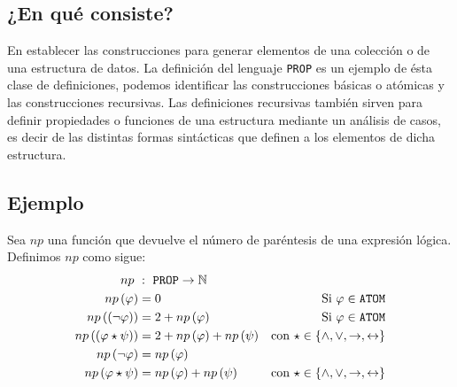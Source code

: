 \documentclass[a4paper]{article}
\begin{document}
\subsection{¿En qué consiste?}
\noindent
En establecer las construcciones para generar elementos de una colección o de una estructura de datos.
\newline
La definición del lenguaje \texttt{PROP} es un ejemplo de ésta clase de definiciones, podemos identificar las 
construcciones básicas o atómicas y las construcciones recursivas.
\newline 
Las definiciones recursivas también sirven para definir propiedades o funciones de una estructura mediante un
análisis de casos, es decir de las distintas formas sintácticas que definen a los elementos de dicha estructura.
\subsection{Ejemplo}
\noindent
Sea \(np\) una función que devuelve el número de paréntesis de una expresión lógica.
\newline 
Definimos \(np\) como sigue:
\begin{align*}
    np \ &: \ \text{\texttt{PROP}} \to \mathbb{N} &  \\ 
    np\left(\varphi\right) &= 0 & \text{Si \(\varphi \in \text{\texttt{ATOM}}\)} \\ 
    np\left(\left(\neg \varphi \right)\right) &= 2 + np\left(\varphi\right) & \text{Si \(\varphi \in \text{\texttt{ATOM}}\)} \\ 
    np\left(\left(\varphi \star \psi \right)\right) &= 2 + np\left(\varphi\right) + np\left(\psi\right) & \text{con \(\star \in \left\{\land, \lor, \rightarrow, \leftrightarrow\right\}\)} \\ 
    np\left(\neg \varphi\right) &= np\left(\varphi\right) \\
    np\left(\varphi \star \psi \right) &= np\left(\varphi\right) + np\left(\psi\right) & \text{con \(\star \in \left\{\land, \lor, \rightarrow, \leftrightarrow\right\}\)}
\end{align*}
\end{document}
